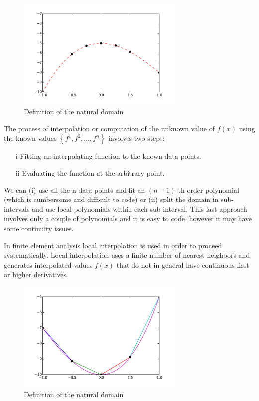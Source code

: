 \begin{figure}[h]
\centering
\includegraphics[width=8cm]{img/interpol1.pdf}
\caption{Definition of the natural domain}
\label{fig:interpol1}
\end{figure}

The process of interpolation or computation of the unknown value of $f(x)$ using the known values $\left\{ {{f^1},{f^2},...,{f^n}} \right\}$ involves two steps:

\begin{itemize}
\item[i]  Fitting an interpolating function to the known data points.
\item[ii] Evaluating the function at the arbitrary point.
\end{itemize}

We can (i) use all the n-data points and fit an $(n-1)$-th order polynomial (which is cumbersome and difficult to code) or (ii) split the domain in sub-intervals and use local polynomials within each sub-interval. This last approach involves only a couple of polynomials and it is easy to code, however it may have some continuity issues.

In finite element analysis local interpolation is used in order to proceed systematically. Local interpolation uses a finite number of nearest-neighbors and generates interpolated values $f(x)$ that do not in general have continuous first or higher derivatives.

\begin{figure}[h]
\centering
\includegraphics[width=8cm]{img/interpol2.pdf}
\caption{Definition of the natural domain}
\label{fig:interpol2}
\end{figure}

